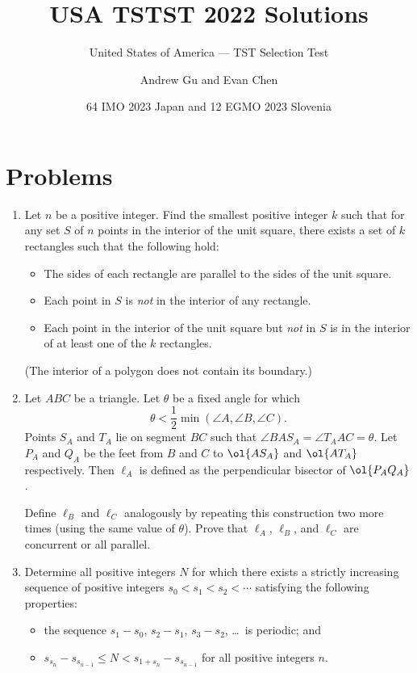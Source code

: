 \documentclass[11pt]{scrartcl}
\begin{document}
\title{USA TSTST 2022 Solutions}
\subtitle{United States of America --- TST Selection Test}
\author{Andrew Gu and Evan Chen}
\date{64 IMO 2023 Japan and 12 EGMO 2023 Slovenia}

\maketitle

\tableofcontents
\newpage

\addtocounter{section}{-1}
\section{Problems}
\begin{enumerate}[\bfseries 1.]
\item %
Let $n$ be a positive integer. Find the smallest positive integer $k$ such
that for any set $S$ of $n$ points in the interior of the unit square, there
exists a set of $k$ rectangles such that the following hold:
\begin{itemize}
  \item The sides of each rectangle are parallel to the sides of the unit square.
  \item Each point in $S$ is \emph{not} in the interior of any rectangle.
  \item Each point in the interior of the unit square but \emph{not} in $S$
    is in the interior of at least one of the $k$ rectangles.
\end{itemize}
(The interior of a polygon does not contain its boundary.)

\item %
Let $ABC$ be a triangle.
Let $\theta$ be a fixed angle for which
\[ \theta < \frac12 \min(\angle A, \angle B, \angle C). \]
Points $S_A$ and $T_A$ lie on segment $BC$
such that $\angle BAS_A = \angle T_AAC = \theta$.
Let $P_A$ and $Q_A$ be the feet from $B$ and $C$
to $\ol{AS_A}$ and $\ol{AT_A}$ respectively.
Then $\ell_A$ is defined as the perpendicular bisector of $\ol{P_A Q_A}$.

Define $\ell_B$ and $\ell_C$ analogously by repeating this construction
two more times (using the same value of $\theta$).
Prove that $\ell_A$, $\ell_B$, and $\ell_C$ are concurrent or all parallel.

\item %
Determine all positive integers $N$ for which there exists a strictly
increasing sequence of positive integers $s_0 < s_1 < s_2 < \dotsb$
satisfying the following properties:
\begin{itemize}
  \item the sequence $s_1-s_0$, $s_2-s_1$, $s_3-s_2$, \dots\ is periodic; and
  \item $s_{s_n} - s_{s_{n-1}} \le N < s_{1+s_n} - s_{s_{n-1}}$ for all
    positive integers $n$.
\end{itemize}


\end{enumerate}
\end{document}
